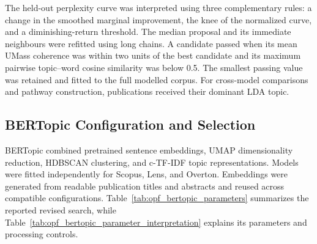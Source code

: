 \documentclass[a4paper,fleqn]{cas-sc}
\begin{document}
The held-out perplexity curve was interpreted using three complementary rules: a change in the smoothed marginal improvement, the knee of the normalized curve, and a diminishing-return threshold. The median proposal and its immediate neighbours were refitted using long chains. A candidate passed when its mean UMass coherence was within two units of the best candidate and its maximum pairwise topic--word cosine similarity was below 0.5. The smallest passing value was retained and fitted to the full modelled corpus. For cross-model comparisons and pathway construction, publications received their dominant LDA topic.


\subsection{BERTopic Configuration and Selection}\label{sec:bertopic_modelling}

BERTopic combined pretrained sentence embeddings, UMAP dimensionality reduction, HDBSCAN clustering, and c-TF-IDF topic representations. Models were fitted independently for Scopus, Lens, and Overton. Embeddings were generated from readable publication titles and abstracts and reused across compatible configurations. Table~\ref{tab:opf_bertopic_parameters} summarizes the reported revised search, while Table~\ref{tab:opf_bertopic_parameter_interpretation} explains its parameters and processing controls.
\end{document}
